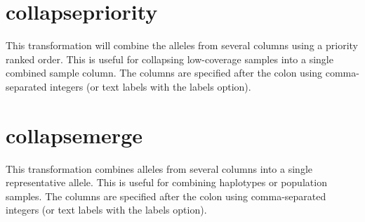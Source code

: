 \documentclass[letterpaper,11pt,english]{sphinxmanual}
\begin{document}
\section{collapsepriority}
\label{\detokenize{mvf_filter_modules:collapsepriority}}
This transformation will combine the alleles from several
columns using a priority ranked order. This is useful for collapsing
low-coverage samples into a single combined sample column.
The columns  are specified after the colon using comma-separated integers
(or text labels with the \textendash{}labels option).

\begin{sphinxVerbatim}[commandchars=\\\{\}]
  
 
 
 
\end{sphinxVerbatim}


\section{collapsemerge}
\label{\detokenize{mvf_filter_modules:collapsemerge}}
This transformation combines alleles from several columns
into a single representative allele. This is useful for
combining haplotypes or population samples. The columns
are specified after the colon using comma-separated integers
(or text labels with the \textendash{}labels option).

\begin{sphinxVerbatim}[commandchars=\\\{\}]
  
 
 
 
\end{sphinxVerbatim}
\end{document}
